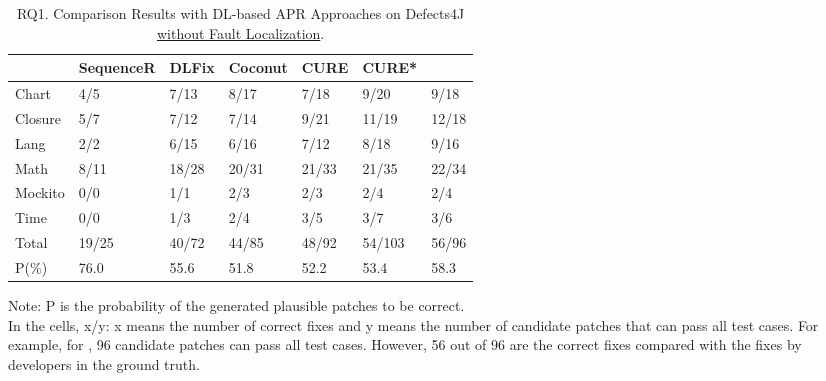 


\begin{table}[t]
  \caption{RQ1. Comparison Results with DL-based APR Approaches on Defects4J \underline {without Fault Localization}.}
  \vspace{-6pt}
  {\small
			\begin{center}
				\renewcommand{\arraystretch}{1}
				\begin{tabular}{p{0.8cm}<{\centering}|p{1.2cm}<{\centering}|p{0.9cm}<{\centering}|p{1cm}<{\centering}|p{0.8cm}<{\centering}|p{0.8cm}<{\centering}|p{0.8cm}<{\centering}}
					
					\hline
					&\textbf{SequenceR}&\textbf{DLFix}& \textbf{Coconut}&\textbf{CURE}&\textbf{CURE*}&\textbf{\tool}\\
					\hline
					Chart  & 4/5   & 7/13  & 8/17  & 7/18  & 9/20  & 9/18\\
					Closure& 5/7   & 7/12  & 7/14  & 9/21 & 11/19  & 12/18\\
					Lang   & 2/2   & 6/15  & 6/16  & 7/12 & 8/18  & 9/16\\
					Math    & 8/11  & 18/28 & 20/31 & 21/33 & 21/35 & 22/34\\
					Mockito & 0/0   & 1/1   & 2/3   & 2/3  &2/4  & 2/4\\
					Time    & 0/0   & 1/3   & 2/4   & 3/5  &3/7  & 3/6\\
					\hline
					Total   & 19/25 & 40/72 & 44/85 & 48/92 & 54/103 & 56/96\\
					\hline
					P(\%)  & 76.0  & 55.6  & 51.8  & 52.2  &  53.4 & 58.3\\
					\hline
				\end{tabular}
			{\footnotesize{
				Note: P is the probability of the generated plausible patches to be correct.\\
				In the cells, x/y: x means the number of correct fixes and y means the number of candidate patches that can pass all test cases. For example, for \tool, 96 candidate patches can pass all test cases. However, 56 out of 96 are the correct fixes compared with the fixes by developers in the ground truth.}}
			{\color{red}{CURE: the cure approach with 5 hours limitation per bug which is the same setting as our \tool. CURE*: the cure approach with their own setting that validating the top 5,000 candidate patches per bug}}
				\label{RQ1_defect4j}
			\end{center}
                }
		\end{table}


